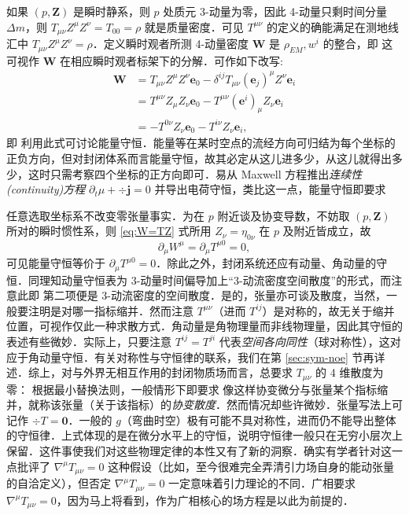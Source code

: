 如果 $(p,\bm Z)$ 是瞬时静系，则 $p$ 处质元 3-动量为零，因此 4-动量只剩时间分量 $\Delta m$，则 $T_{\mu\nu}Z^\mu Z^\nu=T_{00}=\rho$ 就是质量密度．可见 $T^{\mu\nu}$ 的定义的确能满足在测地线汇中 $T_{\mu\nu}Z^\mu Z^\nu=\rho$．定义瞬时观者所测 4-动量密度 $\bm W$ 是 $\rho_{EM},w^i$ 的整合，即
这可视作 $\bm W$ 在相应瞬时观者标架下的分解．可作如下改写:
\begin{align*}
    \bm W
    &=T_{\mu\nu}Z^\mu Z^\nu \bm e_0-\delta^{ij}T_{\mu\nu}(\bm e_j)^\mu Z^\nu\bm e_i\\
    &=T^{\mu\nu}Z_\mu Z_\nu \bm e_0-T^{\mu\nu}(\bm e^i)_\mu Z_\nu\bm e_i\\
    &=-T^{0\nu}Z_\nu\bm e_0-T^{i\nu}Z_\nu\bm e_i,
\end{align*}
即
利用此式可讨论能量守恒．能量等在某时空点的流经方向可归结为每个坐标的正负方向，但对封闭体系而言能量守恒，故其必定从这儿进多少，从这儿就得出多少，这时只需考察四个坐标的正方向即可．易从 Maxwell 方程推出\textit{连续性(continuity)方程} $\partial_t\mu+\div\bm j=0$ 并导出电荷守恒，类比这一点，能量守恒即要求

任意选取坐标系不改变零张量事实．为在 $p$ 附近谈及协变导数，不妨取 $(p,\bm Z)$ 所对的瞬时惯性系，则 \eqref{eq:W=TZ} 式所用 $Z_\nu=\eta_{0\nu}$ 在 $p$ 及附近皆成立，故
\[
    \partial_\mu W^\mu=\partial_\mu T^{\mu 0}=0,
\]
可见能量守恒等价于 $\partial_\mu T^{\mu 0}=0$．除此之外，封闭系统还应有动量、角动量的守恒．同理知动量守恒表为 3-动量时间偏导加上“3-动流密度空间散度”的形式，而注意此即
第二项便是 3-动流密度的空间散度．是的，张量亦可谈及散度，当然，一般要注明是对哪一指标缩并．然而注意 $T^{\mu\nu}$（进而 $T^{ij}$）是对称的，故无关于缩并位置，可视作仅此一种求散方式．角动量是角物理量而非线物理量，因此其守恒的表述有些微妙．实际上，只要注意 $T^{ij}=T^{ji}$ 代表\textit{空间各向同性}（球对称性），这对应于角动量守恒．有关对称性与守恒律的联系，我们在第 \ref{sec:sym-noe} 节再详述．综上，对与外界无相互作用的封闭物质场而言，总要求 $T_{\mu\nu}$ 的 4 维散度为零：
根据最小替换法则，一般情形下即要求
像这样协变微分与张量某个指标缩并，就称该张量（关于该指标）的\textit{协变散度}．然而情况却些许微妙．张量写法上可记作 $\div T=\bm 0$．一般的 $g$（弯曲时空）极有可能不具对称性，进而仍不能导出整体的守恒律．上式体现的是在微分水平上的守恒，说明守恒律一般只在无穷小层次上保留．这件事使我们对这些物理定律的本性又有了新的洞察．确实有学者针对这一点批评了 $\nabla^\mu T_{\mu\nu}=0$ 这种假设（比如，至今很难完全弄清引力场自身的能动张量的自洽定义），但否定 $\nabla^\mu T_{\mu\nu}=0$ 一定意味着引力理论的不同．广相要求 $\nabla^\mu T_{\mu\nu}=0$，因为马上将看到，作为广相核心的场方程是以此为前提的．

